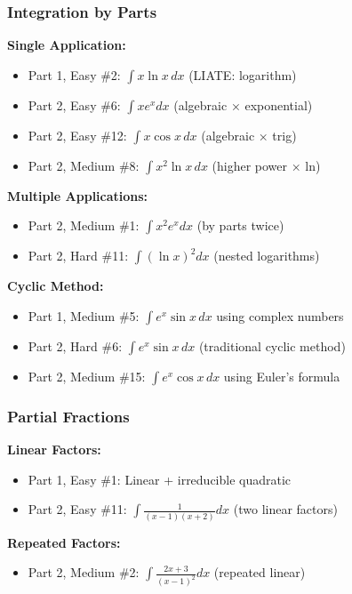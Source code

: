\subsubsection*{Integration by Parts}

\textbf{Single Application:}
\begin{itemize}
  \item Part 1, Easy \#2: $\int x\ln x \, dx$ (LIATE: logarithm)
  \item Part 2, Easy \#6: $\int xe^x dx$ (algebraic × exponential)
  \item Part 2, Easy \#12: $\int x\cos x \, dx$ (algebraic × trig)
  \item Part 2, Medium \#8: $\int x^2 \ln x \, dx$ (higher power × ln)
\end{itemize}

\textbf{Multiple Applications:}
\begin{itemize}
  \item Part 2, Medium \#1: $\int x^2 e^x dx$ (by parts twice)
  \item Part 2, Hard \#11: $\int (\ln x)^2 dx$ (nested logarithms)
\end{itemize}

\textbf{Cyclic Method:}
\begin{itemize}
  \item Part 1, Medium \#5: $\int e^x \sin x \, dx$ using complex numbers
  \item Part 2, Hard \#6: $\int e^x \sin x \, dx$ (traditional cyclic method)
  \item Part 2, Medium \#15: $\int e^x \cos x \, dx$ using Euler's formula
\end{itemize}

\subsubsection*{Partial Fractions}

\textbf{Linear Factors:}
\begin{itemize}
  \item Part 1, Easy \#1: Linear + irreducible quadratic
  \item Part 2, Easy \#11: $\int \frac{1}{(x-1)(x+2)}dx$ (two linear factors)
\end{itemize}

\textbf{Repeated Factors:}
\begin{itemize}
  \item Part 2, Medium \#2: $\int \frac{2x+3}{(x-1)^2}dx$ (repeated linear)
\end{itemize}

